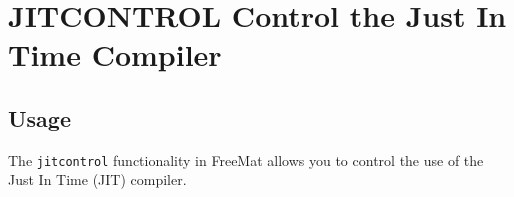 \section{JITCONTROL Control the Just In Time Compiler}

\subsection{Usage}

The \verb|jitcontrol| functionality in FreeMat allows you to control
the use of the Just In Time (JIT) compiler.  
